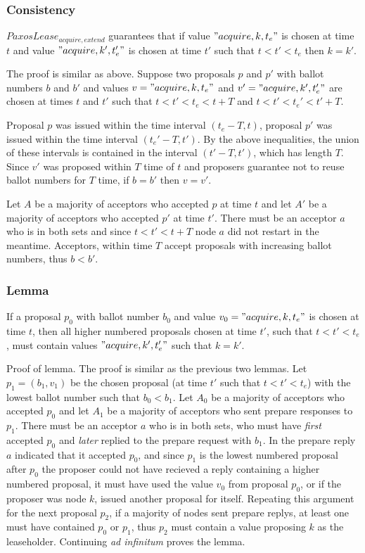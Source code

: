 \documentclass[12pt]{article}
\begin{document}
\subsubsection{ Consistency } $PaxosLease_{acquire, extend}$ guarantees that if value $"acquire, k, t_e"$ is chosen at time $t$ and value $"acquire, k', t_e'"$ is chosen at time $t'$ such that $t < t' < t_e$ then $k = k'$.

The proof is similar as above. Suppose two proposals $p$ and $p'$ with ballot numbers $b$ and $b'$ and values $v = "acquire, k, t_e"$ and $v' = "acquire, k', t_e'"$ are chosen at times $t$ and $t'$ such that $t < t' < t_e < t + T$ and $t < t' < t_e' < t' + T$.

Proposal $p$ was issued within the time interval $(t_e - T, t)$, proposal $p'$ was issued within the time interval $(t_e' - T, t')$. By the above inequalities, the union of these intervals is contained in the interval $(t' - T, t')$, which has length $T$. Since $v'$ was proposed within $T$ time of $t$ and proposers guarantee not to reuse ballot numbers for $T$ time, if $b = b'$ then $v = v'$.

Let $A$ be a majority of acceptors who accepted $p$ at time $t$ and let $A'$ be a majority of acceptors who accepted $p'$ at time $t'$.  There must be an acceptor $a$ who is in both sets and since $t < t' < t + T$ node $a$ did not restart in the meantime. Acceptors, within time $T$ accept proposals with increasing ballot numbers, thus $b < b'$.

\subsubsection{ Lemma } If a proposal $p_0$ with ballot number $b_0$ and value $v_0 = "acquire, k, t_e"$ is chosen at time $t$, then all higher numbered proposals chosen at time $t'$, such that $t < t' < t_e$, must contain values $"acquire, k', t_e'"$ such that $k = k'$.

Proof of lemma. The proof is similar as the previous two lemmas. Let $p_1 = (b_1, v_1)$ be the chosen proposal (at time $t'$ such that $t < t' < t_e$) with the lowest ballot number such that $b_0 < b_1$. Let $A_0$ be a majority of acceptors who accepted $p_0$ and let $A_1$ be a majority of acceptors who sent prepare responses to $p_1$. There must be an acceptor $a$ who is in both sets, who must have \emph{first} accepted $p_0$ and \emph{later} replied to the prepare request with $b_1$. In the prepare reply $a$ indicated that it accepted $p_0$, and since $p_1$ is the lowest numbered proposal after $p_0$ the proposer could not have recieved a reply containing a higher numbered proposal, it must have used the value $v_0$ from proposal $p_0$, or if the proposer was node $k$, issued another proposal for itself. Repeating this argument for the next proposal $p_2$, if a majority of nodes sent prepare replys, at least one must have contained $p_0$ or $p_1$, thus $p_2$ must contain a value proposing $k$ as the leaseholder. Continuing \emph{ad infinitum} proves the lemma.
\end{document}
